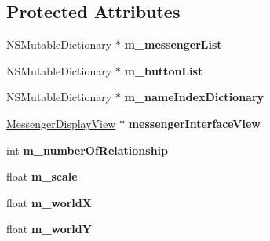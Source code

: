 \subsection*{Protected Attributes}
\begin{DoxyCompactItemize}
\item 
\hypertarget{interface_messenger_view_controller_aa7a06978c9d2e2580a0cd3b19467c204}{
NSMutableDictionary $\ast$ {\bfseries m\_\-messengerList}}
\label{interface_messenger_view_controller_aa7a06978c9d2e2580a0cd3b19467c204}

\item 
\hypertarget{interface_messenger_view_controller_afb79d57e4d89d863e81dc6bf77e33d7d}{
NSMutableDictionary $\ast$ {\bfseries m\_\-buttonList}}
\label{interface_messenger_view_controller_afb79d57e4d89d863e81dc6bf77e33d7d}

\item 
\hypertarget{interface_messenger_view_controller_a70f8ee629bb1e1c67dc0e74389d29c29}{
NSMutableDictionary $\ast$ {\bfseries m\_\-nameIndexDictionary}}
\label{interface_messenger_view_controller_a70f8ee629bb1e1c67dc0e74389d29c29}

\item 
\hypertarget{interface_messenger_view_controller_a8cbd0807ee7f3d3a50ad46cfb6dfed21}{
\hyperlink{interface_messenger_display_view}{MessengerDisplayView} $\ast$ {\bfseries messengerInterfaceView}}
\label{interface_messenger_view_controller_a8cbd0807ee7f3d3a50ad46cfb6dfed21}

\item 
\hypertarget{interface_messenger_view_controller_af273157267a9808e9bb252e3a43f80c6}{
int {\bfseries m\_\-numberOfRelationship}}
\label{interface_messenger_view_controller_af273157267a9808e9bb252e3a43f80c6}

\item 
\hypertarget{interface_messenger_view_controller_a5e7ee1ec43301204e1ef57fb7a3e0153}{
float {\bfseries m\_\-scale}}
\label{interface_messenger_view_controller_a5e7ee1ec43301204e1ef57fb7a3e0153}

\item 
\hypertarget{interface_messenger_view_controller_abf360a74ed5bfcfcc0e2e5d9ca883e4f}{
float {\bfseries m\_\-worldX}}
\label{interface_messenger_view_controller_abf360a74ed5bfcfcc0e2e5d9ca883e4f}

\item 
\hypertarget{interface_messenger_view_controller_a99f4c4324081b5a093411151cb82bb96}{
float {\bfseries m\_\-worldY}}
\label{interface_messenger_view_controller_a99f4c4324081b5a093411151cb82bb96}

\end{DoxyCompactItemize}


